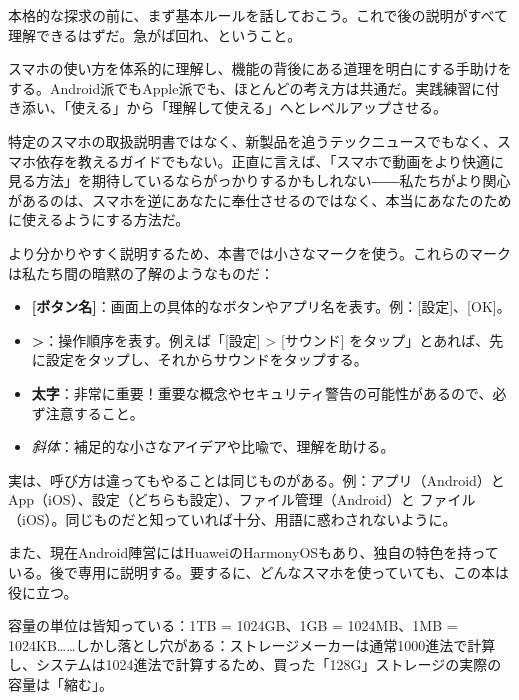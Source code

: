 
本格的な探求の前に、まず基本ルールを話しておこう。これで後の説明がすべて理解できるはずだ。急がば回れ、ということ。


スマホの使い方を体系的に理解し、機能の背後にある道理を明白にする手助けをする。Android派でもApple派でも、ほとんどの考え方は共通だ。実践練習に付き添い、「使える」から「理解して使える」へとレベルアップさせる。

特定のスマホの取扱説明書ではなく、新製品を追うテックニュースでもなく、スマホ依存を教えるガイドでもない。正直に言えば、「スマホで動画をより快適に見る方法」を期待しているならがっかりするかもしれない――私たちがより関心があるのは、スマホを逆にあなたに奉仕させるのではなく、本当にあなたのために使えるようにする方法だ。


より分かりやすく説明するため、本書では小さなマークを使う。これらのマークは私たち間の暗黙の了解のようなものだ：

\begin{itemize}
  \item \textbf{[ボタン名]}：画面上の具体的なボタンやアプリ名を表す。例：[設定]、[OK]。
  \item \textbf{>}：操作順序を表す。例えば「[設定] > [サウンド] をタップ」とあれば、先に設定をタップし、それからサウンドをタップする。
  \item \textbf{太字}：非常に重要！重要な概念やセキュリティ警告の可能性があるので、必ず注意すること。
  \item \emph{斜体}：補足的な小さなアイデアや比喩で、理解を助ける。
\end{itemize}


実は、呼び方は違ってもやることは同じものがある。例：アプリ（Android）と App（iOS）、設定（どちらも設定）、ファイル管理（Android）と ファイル（iOS）。同じものだと知っていれば十分、用語に惑わされないように。

また、現在Android陣営にはHuaweiのHarmonyOSもあり、独自の特色を持っている。後で専用に説明する。要するに、どんなスマホを使っていても、この本は役に立つ。


容量の単位は皆知っている：1TB = 1024GB、1GB = 1024MB、1MB = 1024KB……しかし落とし穴がある：ストレージメーカーは通常1000進法で計算し、システムは1024進法で計算するため、買った「128G」ストレージの実際の容量は「縮む」。

